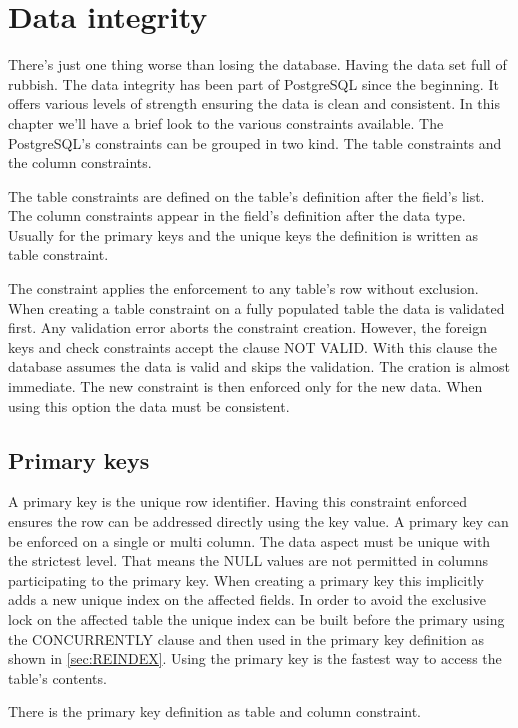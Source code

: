 \chapter{Data integrity}
There's just one thing worse than losing the database. Having the data set full of rubbish. The 
data integrity has been part of PostgreSQL since the beginning. It offers various levels of 
strength ensuring the data is clean and consistent. In this chapter we'll have a brief look to the 
various constraints available. The PostgreSQL's constraints can be grouped in two kind. The table 
constraints and the column constraints. 

The table constraints are defined on the table's definition after the field's list. The column 
constraints appear in the field's definition after the data type. Usually for the primary keys and 
the unique keys the definition is  written as table constraint. 

The constraint applies the enforcement to any table's row without exclusion. When creating a table 
constraint on a fully populated table the data is validated first. Any validation error aborts the 
constraint creation. However, the foreign keys and check constraints accept the clause NOT VALID. 
With this clause the database  assumes the data is valid and skips the validation. The cration is 
almost immediate. The new constraint is then enforced only for the new data. When using this 
option  the data must be consistent.

\section{Primary keys} 
A primary key is the unique row identifier. Having this constraint enforced ensures the row can be 
addressed directly using the key value. A primary key can be enforced on a single or multi column. 
The data aspect must be unique with the strictest level. That means the NULL values are not 
permitted in columns participating to the primary key. When creating a primary key this 
implicitly adds a new unique index on the affected fields. In order to avoid the exclusive lock 
on the affected  table the unique index can be built before the primary using the CONCURRENTLY 
clause and then used in the primary key definition as shown in \ref{sec:REINDEX}. Using the primary 
key is the fastest way to access the table's contents.\newline

There is the primary key definition as table and column constraint.\newpage


